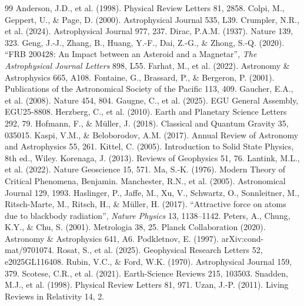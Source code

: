 \documentclass[11pt,a4paper]{article}
\begin{document}
	\begin{thebibliography}{99}
		 Anderson, J.D., et al. (1998). Physical Review Letters 81, 2858.
		 Colpi, M., Geppert, U., \& Page, D. (2000). Astrophysical Journal 535, L39.
		 Crumpler, N.R., et al. (2024). Astrophysical Journal 977, 237.
		 Dirac, P.A.M. (1937). Nature 139, 323.
		 Geng, J.-J., Zhang, B., Huang, Y.-F., Dai, Z.-G., \& Zhong, S.-Q. (2020). ``FRB 200428: An Impact between an Asteroid and a Magnetar'', \emph{The Astrophysical Journal Letters} 898, L55.
		 Farhat, M., et al. (2022). Astronomy \& Astrophysics 665, A108.
		 Fontaine, G., Brassard, P., \& Bergeron, P. (2001). Publications of the Astronomical Society of the Pacific 113, 409.
		 Gaucher, E.A., et al. (2008). Nature 454, 804.
		 Gaugne, C., et al. (2025). EGU General Assembly, EGU25-8808.
		 Herzberg, C., et al. (2010). Earth and Planetary Science Letters 292, 79.
		 Hofmann, F., \& Müller, J. (2018). Classical and Quantum Gravity 35, 035015.
		 Kaspi, V.M., \& Beloborodov, A.M. (2017). Annual Review of Astronomy and Astrophysics 55, 261.
		 Kittel, C. (2005). Introduction to Solid State Physics, 8th ed., Wiley.
		 Korenaga, J. (2013). Reviews of Geophysics 51, 76.
		 Lantink, M.L., et al. (2022). Nature Geoscience 15, 571.
		 Ma, S.-K. (1976). Modern Theory of Critical Phenomena, Benjamin.
		 Manchester, R.N., et al. (2005). Astronomical Journal 129, 1993.
		 Haslinger, P., Jaffe, M., Xu, V., Schwartz, O., Sonnleitner, M., Ritsch-Marte, M., Ritsch, H., \& Müller, H. (2017). ``Attractive force on atoms due to blackbody radiation'', \emph{Nature Physics} 13, 1138–1142.
		 Peters, A., Chung, K.Y., \& Chu, S. (2001). Metrologia 38, 25.
		 Planck Collaboration (2020). Astronomy \& Astrophysics 641, A6.
		 Podkletnov, E. (1997). arXiv:cond-mat/9701074.
		 Rosat, S., et al. (2025). Geophysical Research Letters 52, e2025GL116408.
		 Rubin, V.C., \& Ford, W.K. (1970). Astrophysical Journal 159, 379.
		 Scotese, C.R., et al. (2021). Earth-Science Reviews 215, 103503.
		 Snadden, M.J., et al. (1998). Physical Review Letters 81, 971.
		 Uzan, J.-P. (2011). Living Reviews in Relativity 14, 2.

\end{thebibliography}
\end{document}
